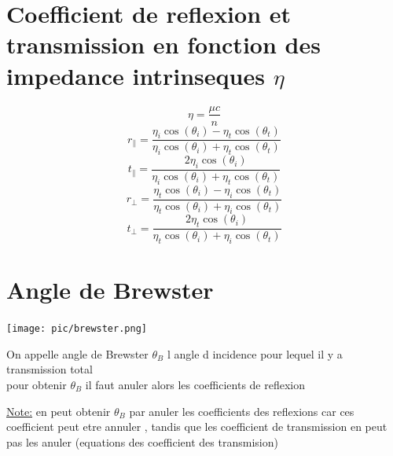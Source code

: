 \documentclass[12pt]{book}
\begin{document}
        \section{Coefficient de reflexion et transmission en fonction des impedance intrinseques $\eta$}
            \[\eta = \frac{\mu c}{n}\]
            \[ r_\parallel = \frac{\eta_i \cos(\theta_i)-\eta_t\cos(\theta_t)}{\eta_i \cos(\theta_i)+\eta_t\cos(\theta_t)}\]
            \[ t_\parallel = \frac{2\eta_i \cos(\theta_i)}{\eta_i \cos(\theta_i)+\eta_t\cos(\theta_t)}\]
            \[ r_\perp = \frac{\eta_t \cos(\theta_i)-\eta_i\cos(\theta_t)}{\eta_t \cos(\theta_i)+\eta_i\cos(\theta_t)}\]
            \[ t_\perp = \frac{2\eta_t \cos(\theta_i)}{\eta_t \cos(\theta_i)+\eta_i\cos(\theta_t)}\]
        \section{Angle de Brewster }
            \begin{center}
                \texttt{[image: pic/brewster.png]}
            \end{center}
            On appelle angle de Brewster $\theta_B$ l angle d incidence pour lequel il y a transmission total \\
            pour obtenir $\theta_B$ il faut anuler alors les coefficients de reflexion \\
            \begin{center}
            \end{center}
            \begin{center}
                \underline{Note:} en peut obtenir $\theta_B$ par anuler les coefficients des reflexions car ces coefficient peut etre annuler , tandis que les coefficient de transmission en peut pas les anuler (equations des coefficient des transmision)
            \end{center}
\end{document}

